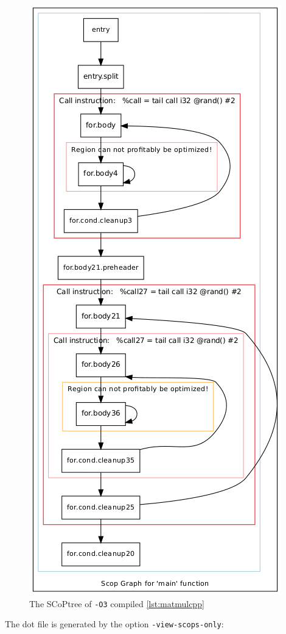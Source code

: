\begin{figure}[!h]
    \centering
    \caption{The SCoPtree of \texttt{-O3} compiled \autoref{lst:matmulcpp}}
    \label{fig:exampleScop}
    \includegraphics[height=\textheight]{gfx/matmulScops.png}
\end{figure}
The dot file is generated by the option \texttt{-view-scops-only}:
